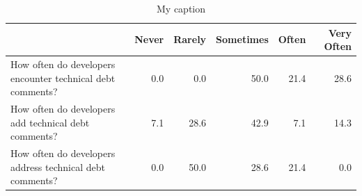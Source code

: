 






\begin{table}[]
	\centering
	\caption{My caption}
	\label{my-label}
	\begin{tabular}{@{}lrrrrr@{}}
		\toprule
		\textbf{} & \textbf{Never} & \textbf{Rarely} & \textbf{Sometimes} & \textbf{Often} & \textbf{Very Often} \\ \midrule
		How often do developers encounter technical debt comments? & 0.0 & 0.0 & 50.0 & 21.4 & 28.6 \\
		How often do developers add technical debt comments? & 7.1 & 28.6 & 42.9 & 7.1 & 14.3 \\
		How often do developers address technical debt comments? & 0.0 & 50.0 & 28.6 & 21.4 & 0.0 \\ \bottomrule
	\end{tabular}
\end{table}









